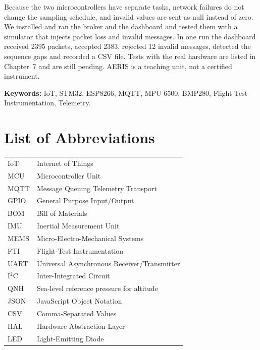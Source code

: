 \documentclass[12pt,a4paper]{report}
\begin{document}
Because the two microcontrollers have separate tasks, network failures do not change the sampling schedule, and invalid values are sent as null instead of zero. We installed and ran the broker and the dashboard and tested them with a simulator that injects packet loss and invalid messages. In one run the dashboard received 2395 packets, accepted 2383, rejected 12 invalid messages, detected the sequence gaps and recorded a CSV file. Tests with the real hardware are listed in Chapter~7 and are still pending. AERIS is a teaching unit, not a certified instrument.

\vspace{0.5cm}
\noindent\textbf{Keywords:} IoT, STM32, ESP8266, MQTT, MPU-6500, BMP280, Flight Test Instrumentation, Telemetry.

\tableofcontents
\clearpage
\listoffigures
{}
\clearpage
\listoftables
{}

\chapter*{List of Abbreviations}
\begin{tabular}{@{}ll@{}}
IoT   & Internet of Things\\
MCU   & Microcontroller Unit\\
MQTT  & Message Queuing Telemetry Transport\\
GPIO  & General Purpose Input/Output\\
BOM   & Bill of Materials\\
IMU   & Inertial Measurement Unit\\
MEMS  & Micro-Electro-Mechanical Systems\\
FTI   & Flight-Test Instrumentation\\
UART  & Universal Asynchronous Receiver/Transmitter\\
I$^2$C & Inter-Integrated Circuit\\
QNH   & Sea-level reference pressure for altitude\\
JSON  & JavaScript Object Notation\\
CSV   & Comma-Separated Values\\
HAL   & Hardware Abstraction Layer\\
LED   & Light-Emitting Diode\\
\end{tabular}
\end{document}
